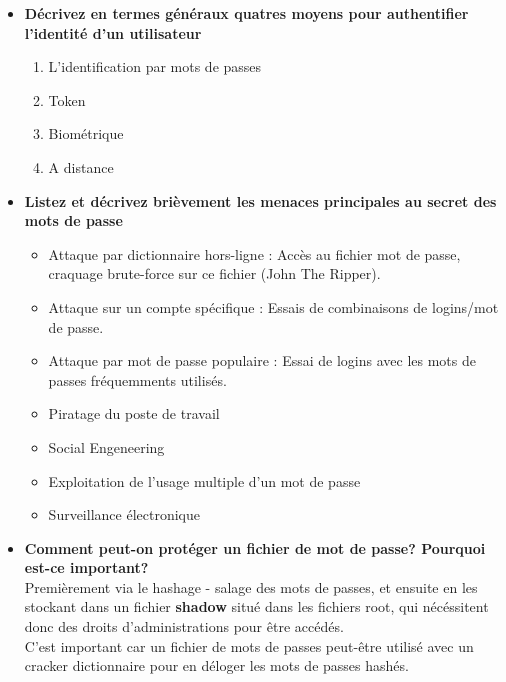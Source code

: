 \documentclass{report}
\begin{document}
			\begin{itemize}
				\item \textbf{Décrivez en termes généraux quatres moyens pour authentifier l'identité d'un utilisateur}\\

					\begin{enumerate}
						\item L'identification par mots de passes
						\item Token
						\item Biométrique
						\item A distance\\
					\end{enumerate}

				\item \textbf{Listez et décrivez brièvement les menaces principales au secret des mots de passe}\\

					\begin{itemize}
						\item Attaque par dictionnaire hors-ligne : Accès au fichier mot de passe, craquage brute-force sur ce fichier (John The Ripper).
						\item Attaque sur un compte spécifique : Essais de combinaisons de logins/mot de passe.
						\item Attaque par mot de passe populaire : Essai de logins avec les mots de passes fréquemments utilisés.
						\item Piratage du poste de travail
						\item Social Engeneering
						\item Exploitation de l'usage multiple d'un mot de passe
						\item Surveillance électronique\\
					\end{itemize}

				\item \textbf{Comment peut-on protéger un fichier de mot de passe? Pourquoi est-ce important?}\\

					Premièrement via le hashage - salage des mots de passes, et ensuite en les stockant dans un fichier \textbf{shadow} situé dans les fichiers root, qui nécéssitent donc des droits d'administrations pour être accédés.\\
					C'est important car un fichier de mots de passes peut-être utilisé avec un cracker dictionnaire pour en déloger les mots de passes hashés.\\


\end{itemize}
\end{document}
